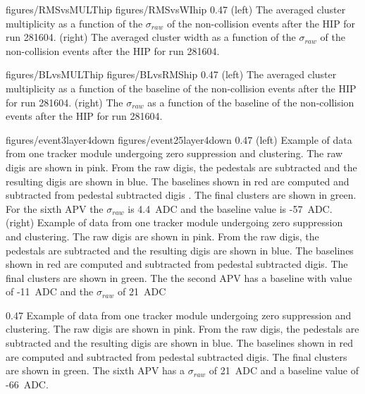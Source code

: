                  {figures/RMSvsMULThip} %
                 {figures/RMSvsWIhip} %
                 {0.47}       %
                 {(left) The averaged cluster multiplicity as a function of the $\sigma_{raw}$ of the non-collision events after the HIP for run 281604. (right) The averaged cluster width as a function of the $\sigma_{raw}$   of the non-collision events after the HIP for run 281604. } %

                 {figures/BLvsMULThip} %
                 {figures/BLvsRMShip} %
                 {0.47}       %
                 {(left) The averaged cluster multiplicity as a function of the baseline  of the non-collision events after the HIP for run 281604. (right) The $\sigma_{raw}$ as a function of the baseline of the non-collision events after the HIP for run 281604. } %


                 {figures/event3layer4down} %
                 {figures/event25layer4down} %
                 {0.47}       %
                 {(left) Example of data from one tracker module undergoing zero suppression and clustering. The raw digis are shown in pink. From the raw digis, the pedestals are subtracted and the resulting digis are shown in blue. The baselines shown in red are computed and subtracted from pedestal subtracted digis . The final clusters are shown in green. For the sixth APV the $\sigma_{raw}$ is 4.4~ADC and the baseline value is -57~ADC. (right) Example of data from one tracker module undergoing zero suppression and clustering. The raw digis are shown in pink. From the raw digis, the pedestals are subtracted and the resulting digis are shown in blue. The baselines shown in red are computed and subtracted from pedestal subtracted digis. The final clusters are shown in green. The the second APV has a baseline with value of -11~ADC and the $\sigma_{raw}$ of 21~ADC} %

                 {0.47}       %
                 {Example of data from one tracker module undergoing zero suppression and clustering. The raw digis are shown in pink. From the raw digis, the pedestals are subtracted and the resulting digis are shown in blue. The baselines shown in red are computed and subtracted from pedestal subtracted digis. The final clusters are shown in green. The sixth APV has a $\sigma_{raw}$ of 21~ADC and a baseline value of -66~ADC.} %


